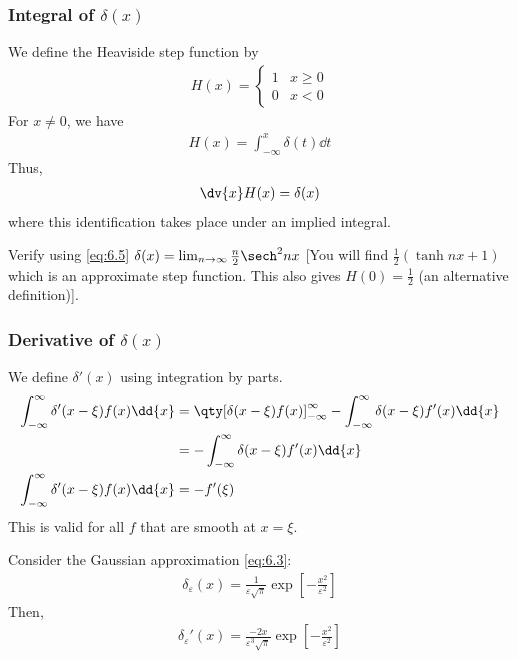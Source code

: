 \subsubsection{Integral of $\delta(x)$}
We define the Heaviside step function by
\begin{align} \label{eq:6.6}
	H(x) = \begin{cases}
		1 & x \geq 0 \\
		0 & x < 0
	\end{cases}
\end{align}
For $x \neq 0$, we have
\begin{align} \label{eq:6.7}
	H(x) = \int_{-\infty}^x \delta(t) \dd{t}
\end{align}
Thus,
\begin{align*}
	\dv{x} H(x) = \delta(x)
\end{align*}
where this identification takes place under an implied integral.

\begin{exercise}
	Verify using \cref{eq:6.5} $\delta(x) = \lim_{n \to \infty} \frac{n}{2} \sech^2 nx$ [You will find $\frac{1}{2} (\tanh nx + 1)$ which is an approximate step function. This also gives $H(0) = \frac{1}{2}$ (an alternative definition)].
\end{exercise} 

\subsubsection{Derivative of $\delta(x)$}
We define $\delta'(x)$ using integration by parts.
\begin{align}
	\int_{-\infty}^\infty \delta'(x-\xi) f(x) \dd{x} &= \qty[\delta(x-\xi) f(x)]_{-\infty}^\infty - \int_{-\infty}^\infty \delta(x-\xi) f'(x) \dd{x} \notag \\
    &= - \int_{-\infty}^\infty \delta(x-\xi) f'(x) \dd{x} \notag \\
    \int_{-\infty}^\infty \delta'(x-\xi) f(x) \dd{x} &= - f'(\xi) \label{eq:6.8}
\end{align}
This is valid for all $f$ that are smooth at $x = \xi$.
\begin{example}
	Consider the Gaussian approximation \cref{eq:6.3}:
	\begin{align*}
		\delta_\varepsilon(x) = \frac{1}{\varepsilon \sqrt{\pi}} \exp[-\frac{x^2}{\varepsilon^2}]
	\end{align*}
	Then,
	\begin{align*}
		\delta_\varepsilon'(x) = \frac{-2x}{\varepsilon^3 \sqrt{\pi}} \exp[-\frac{x^2}{\varepsilon^2}]
	\end{align*}

	\begingroup
	\begin{center}
		
	\end{center} 
	\endgroup
\end{example}

